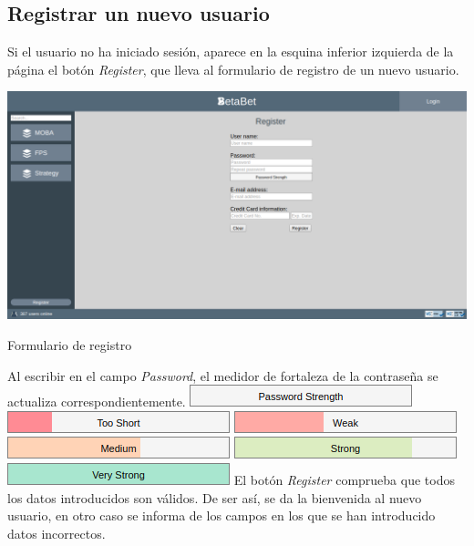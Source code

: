 \documentclass{article}
\begin{document}
\subsection{Registrar un nuevo usuario}
Si el usuario no ha iniciado sesión, aparece en la esquina inferior izquierda de la página el botón \textit{Register}, que lleva al formulario de registro de un nuevo usuario.
\smallbreak
\begin{minipage}{\linewidth}
    \centering
    \captionsetup{type=figure}
    \includegraphics[width=\linewidth]{fig8}
    \caption{Formulario de registro}
    \label{fig:fig8}
\end{minipage}
\smallbreak
Al escribir en el campo \textit{Password}, el medidor de fortaleza de la contraseña se actualiza correspondientemente.
{\centering
    \includegraphics[width=.16\linewidth]{strength1}
    \includegraphics[width=.16\linewidth]{strength2}
    \includegraphics[width=.16\linewidth]{strength3}
    \includegraphics[width=.16\linewidth]{strength4}
    \includegraphics[width=.16\linewidth]{strength5}
    \includegraphics[width=.16\linewidth]{strength6}
}
\medbreak
El botón \textit{Register} comprueba que todos los datos introducidos son válidos. De ser así, se da la bienvenida al nuevo usuario, en otro caso se informa de los campos en los que se han introducido datos incorrectos.
\end{document}
